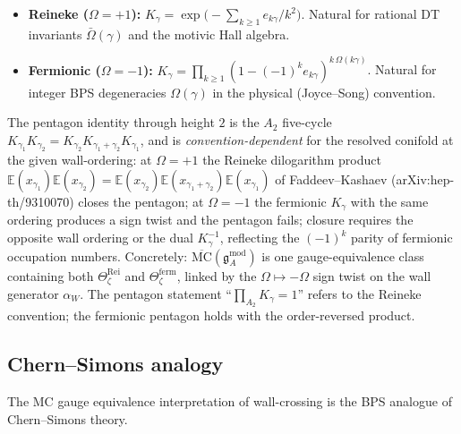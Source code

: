 \begin{remark}
\label{rem:phys-ks-conventions}
\hfill
\begin{itemize}
\item \textbf{Reineke ($\Omega = +1$):}
$K_\gamma = \exp\!\bigl(-\sum_{k \geq 1} e_{k\gamma}/k^2\bigr)$.
Natural for rational DT invariants $\bar{\Omega}(\gamma)$ and the
motivic Hall algebra.
\item \textbf{Fermionic ($\Omega = -1$):}
$K_\gamma = \prod_{k \geq 1} (1 - (-1)^k e_{k\gamma})^{k\,\Omega(k\gamma)}$.
Natural for integer BPS degeneracies $\Omega(\gamma)$ in the physical
(Joyce--Song) convention.
\end{itemize}
The pentagon identity through height $2$ is the $A_2$ five-cycle
$K_{\gamma_1} K_{\gamma_2} = K_{\gamma_2} K_{\gamma_1 + \gamma_2}
K_{\gamma_1}$, and is \emph{convention-dependent} for the resolved
conifold at the given wall-ordering: at $\Omega = +1$ the Reineke
dilogarithm product $\mathbb{E}(x_{\gamma_1}) \mathbb{E}(x_{\gamma_2})
= \mathbb{E}(x_{\gamma_2}) \mathbb{E}(x_{\gamma_1 + \gamma_2})
\mathbb{E}(x_{\gamma_1})$ of Faddeev--Kashaev
(\textup{arXiv:hep-th/9310070}) closes the pentagon; at $\Omega = -1$
the fermionic $K_\gamma$ with the same ordering produces a sign
twist and the pentagon fails; closure requires the opposite wall
ordering or the dual $K_\gamma^{-1}$, reflecting the $(-1)^k$ parity
of fermionic occupation numbers.
Concretely: $\overline{\mathrm{MC}}(\mathfrak{g}^{\mathrm{mod}}_A)$
is one gauge-equivalence class containing both
$\Theta_\zeta^{\mathrm{Rei}}$ and $\Theta_\zeta^{\mathrm{ferm}}$,
linked by the $\Omega \mapsto -\Omega$ sign twist on the wall
generator $\alpha_W$. The pentagon statement
``$\prod_{A_2} K_\gamma = 1$'' refers to the Reineke convention;
the fermionic pentagon holds with the order-reversed product.
\end{remark}

\subsection{Chern--Simons analogy}
\label{ssec:phys-cs-analogy}

The MC gauge equivalence interpretation of wall-crossing is the BPS analogue of Chern--Simons theory.

